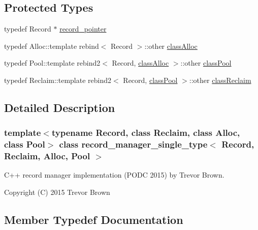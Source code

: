 \subsection*{Protected Types}
\begin{DoxyCompactItemize}
\item 
typedef Record $\ast$ \hyperlink{classrecord__manager__single__type_a065f05d1a84e619758122b3da04b1327}{record\+\_\+pointer}
\item 
typedef Alloc\+::template rebind$<$ Record $>$\+::other \hyperlink{classrecord__manager__single__type_a5cdd0ef714fadb6eb7818aaf69918625}{class\+Alloc}
\item 
typedef Pool\+::template rebind2$<$ Record, \hyperlink{classrecord__manager__single__type_a5cdd0ef714fadb6eb7818aaf69918625}{class\+Alloc} $>$\+::other \hyperlink{classrecord__manager__single__type_a2a7217967912e867c7ab6e4a7f3deeb5}{class\+Pool}
\item 
typedef Reclaim\+::template rebind2$<$ Record, \hyperlink{classrecord__manager__single__type_a2a7217967912e867c7ab6e4a7f3deeb5}{class\+Pool} $>$\+::other \hyperlink{classrecord__manager__single__type_a831ae4c91e0ba85f07fd6b68ef18f035}{class\+Reclaim}
\end{DoxyCompactItemize}


\subsection{Detailed Description}
\subsubsection*{template$<$typename Record, class Reclaim, class Alloc, class Pool$>$\newline
class record\+\_\+manager\+\_\+single\+\_\+type$<$ Record, Reclaim, Alloc, Pool $>$}

C++ record manager implementation (P\+O\+DC 2015) by Trevor Brown.

Copyright (C) 2015 Trevor Brown 

\subsection{Member Typedef Documentation}
\mbox{\label{classrecord__manager__single__type_a5cdd0ef714fadb6eb7818aaf69918625}} 
